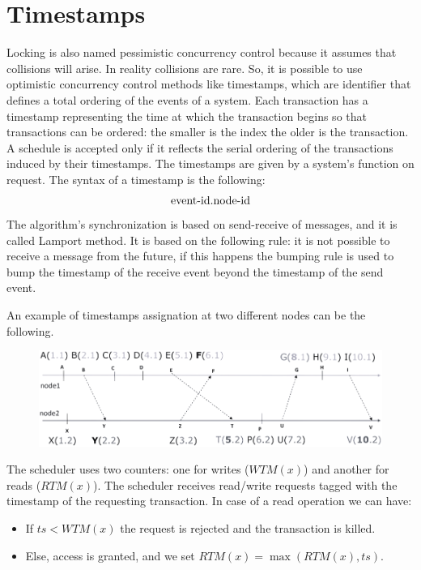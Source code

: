 \documentclass[12pt, a4paper]{report}
\newtheorem[style=M,bodystyle=\normalfont]{theorem}{Theorem}
\newtheorem[style=M,bodystyle=\normalfont]{corollary}{Corollary}
\newtheorem[style=M,bodystyle=\normalfont]{lemma}{Lemma}
\newtheorem[style=M,bodystyle=\normalfont]{definition}{Definition}
\begin{document}
    \section{Timestamps}
    Locking is also named pessimistic concurrency control because it assumes that collisions will arise. In reality collisions are rare. So, it is possible to use optimistic 
    concurrency control methods like timestamps, which are identifier that defines a total ordering of the events of a system. Each transaction has a timestamp representing the time 
    at which the transaction begins so that transactions can be ordered: the smaller is the index the older is the transaction. A schedule is accepted only if it reflects the serial 
    ordering of the transactions induced by their timestamps. The timestamps are given by a system's function on request. The syntax of a timestamp is the following: 
    \[\textnormal{event-id}.\textnormal{node-id}\]
    The algorithm's synchronization is based on send-receive of messages, and it is called Lamport method. It is based on the following rule: it is not possible to receive a  message 
    from the future, if this happens the bumping rule is used to bump the timestamp of the receive event beyond the timestamp of the send event.     
    \begin{example}
        An example of timestamps assignation at two different nodes can be the following. 
        \begin{figure}[H]
            \centering
            \includegraphics[width=0.75\linewidth]{images/timestamps.png}
        \end{figure}
    \end{example}
    The scheduler uses two counters: one for writes ($WTM(x)$) and another for reads ($RTM(x)$). The scheduler receives read/write requests tagged with the timestamp of the 
    requesting transaction. In case of a read operation we can have: 
    \begin{itemize}
        \item If $ts<WTM(x)$ the request is rejected and the transaction is killed. 
        \item Else, access is granted, and we set $RTM(x)=\max(RTM(x),ts)$. 
    \end{itemize}
\end{document}
